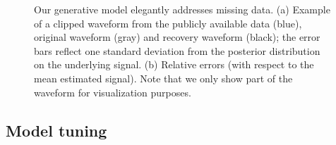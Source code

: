 \documentclass[journal]{IEEEtran}
\begin{document}
\begin{figure}[!htbp]
\centering
{} 
  \caption{ { Our generative model elegantly addresses missing data.
(a) Example of a clipped waveform from the publicly available data (blue), original waveform (gray) and
  recovery waveform (black); the error bars reflect one standard deviation from the posterior distribution on the underlying signal. (b) Relative errors (with respect to the mean estimated signal). Note that we only show part of the waveform for visualization purposes.
   }} \vspace{-20pt} \label{fig:missing}
\end{figure}




\subsection{Model tuning} \label{sec:tuning}
\end{document}
